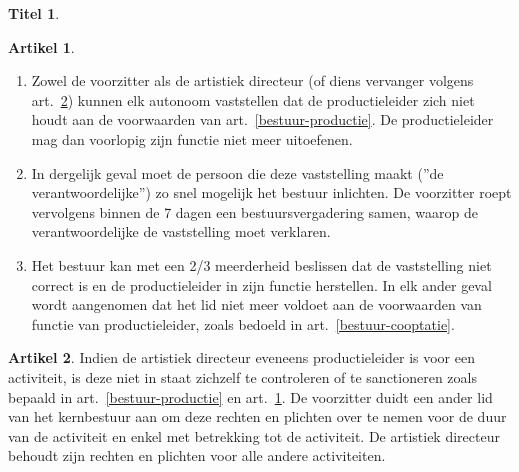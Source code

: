 \documentclass[a4paper,10pt]{article}
\theoremstyle{definition}
\newtheorem{titel}{\newline\Large Titel}
\newtheorem{artikelbase}{\large Artikel}
\newenvironment{artikel}
  {\begin{artikelbase}}
  {\smallskip
   \end{artikelbase}}
\newcommand{\ttextcr}{\hfill\newline}
\newcommand{\ttextenum}{\mbox{}}
\begin{document}
\begin{titel}
  
  \begin{artikel}\label{bestuur-controle}\ttextenum
    \begin{enumerate}
      \item
        Zowel de voorzitter als de artistiek directeur (of diens vervanger volgens art.~\ref{bestuur-vervanging}) kunnen elk autonoom vaststellen dat de productieleider zich niet houdt aan de voorwaarden van art.~\ref{bestuur-productie}.
        De productieleider mag dan voorlopig zijn functie niet meer uitoefenen.
      \item
        In dergelijk geval moet de persoon die deze vaststelling maakt (''de verantwoordelijke'') zo snel mogelijk het bestuur inlichten.
        De voorzitter roept vervolgens binnen de 7 dagen een bestuursvergadering samen, waarop de verantwoordelijke de vaststelling moet verklaren.
      \item
        Het bestuur kan met een 2/3 meerderheid beslissen dat de vaststelling niet correct is en de productieleider in zijn functie herstellen.  
        In elk ander geval wordt aangenomen dat het lid niet meer voldoet aan de voorwaarden van functie van productieleider, zoals bedoeld in art.~\ref{bestuur-cooptatie}.
    \end{enumerate}
  \end{artikel}

  \begin{artikel}\label{bestuur-vervanging}\ttextcr
    Indien de artistiek directeur eveneens productieleider is voor een activiteit, is deze niet in staat zichzelf te controleren of te sanctioneren zoals bepaald in art.~\ref{bestuur-productie} en art.~\ref{bestuur-controle}.
    De voorzitter duidt een ander lid van het kernbestuur aan om deze rechten en plichten over te nemen voor de duur van de activiteit en enkel met betrekking tot de activiteit.
    De artistiek directeur behoudt zijn rechten en plichten voor alle andere activiteiten.
  \end{artikel}

\end{titel}
\end{document}
